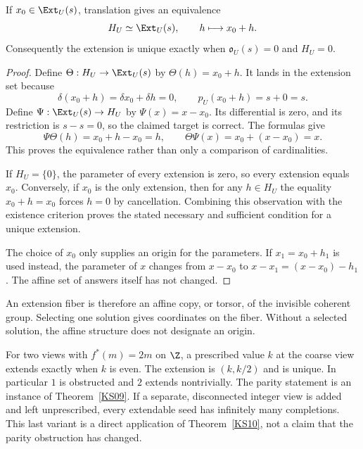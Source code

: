 \begin{theorem}\label{KS10}
If \(x_0\in\Ext_U(s)\), translation gives an equivalence
\[
 H_U\simeq\Ext_U(s),\qquad h\longmapsto x_0+h.
\]
Consequently the extension is unique exactly when \(\mathfrak o_U(s)=0\) and \(H_U=0\).
\end{theorem}
\begin{proof}
Define $\Theta:H_U\to\Ext_U(s)$ by $\Theta(h)=x_0+h$. It lands in the extension set because
\[
 \delta(x_0+h)=\delta x_0+\delta h=0,
 \qquad p_U(x_0+h)=s+0=s.
\]
Define $\Psi:\Ext_U(s)\to H_U$ by $\Psi(x)=x-x_0$. Its differential is zero, and its restriction is $s-s=0$, so the claimed target is correct. The formulas give
\[
 \Psi\Theta(h)=x_0+h-x_0=h,\qquad
 \Theta\Psi(x)=x_0+(x-x_0)=x.
\]
This proves the equivalence rather than only a comparison of cardinalities.

If $H_U=\{0\}$, the parameter of every extension is zero, so every extension equals $x_0$. Conversely, if $x_0$ is the only extension, then for any $h\in H_U$ the equality $x_0+h=x_0$ forces $h=0$ by cancellation. Combining this observation with the existence criterion proves the stated necessary and sufficient condition for a unique extension.

The choice of $x_0$ only supplies an origin for the parameters. If $x_1=x_0+h_1$ is used instead, the parameter of $x$ changes from $x-x_0$ to $x-x_1=(x-x_0)-h_1$. The affine set of answers itself has not changed.
\end{proof}
An extension fiber is therefore an affine copy, or torsor, of the invisible coherent group. Selecting one solution gives coordinates on the fiber. Without a selected solution, the affine structure does not designate an origin.

\begin{example}
For two views with \(f^*(m)=2m\) on \(\Z\), a prescribed value \(k\) at the coarse view extends exactly when \(k\) is even. The extension is \((k,k/2)\) and is unique. In particular \(1\) is obstructed and \(2\) extends nontrivially. The parity statement is an instance of Theorem~\ref{KS09}. If a separate, disconnected integer view is added and left unprescribed, every extendable seed has infinitely many completions. This last variant is a direct application of Theorem~\ref{KS10}, not a claim that the parity obstruction has changed.
\end{example}

